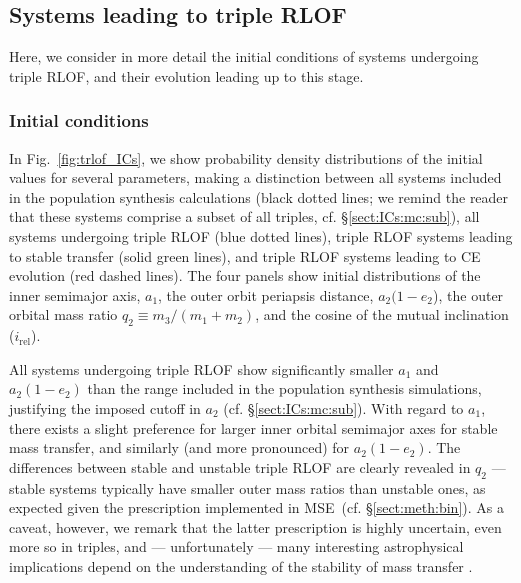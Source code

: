 \documentclass[twocolumn,appendixfloats,tighten]{aastex631}
\newcommand{\F}{Fig.}
\newcommand{\mse}{\textsc{MSE}}
\begin{document}
\subsection{Systems leading to triple RLOF}
\label{sect:popsyn:trlof}
Here, we consider in more detail the initial conditions of systems undergoing triple RLOF, and their evolution leading up to this stage. 

\subsubsection{Initial conditions}
\label{sect:popsyn:trlof:ICs}
In \F~\ref{fig:trlof_ICs}, we show probability density distributions of the initial values for several parameters, making a distinction between all systems included in the population synthesis calculations (black dotted lines; we remind the reader that these systems comprise a subset of all triples, cf. \S\ref{sect:ICs:mc:sub}), all systems undergoing triple RLOF (blue dotted lines), triple RLOF systems leading to stable transfer (solid green lines), and triple RLOF systems leading to CE evolution (red dashed lines). The four panels show initial distributions of the inner semimajor axis, $a_1$, the outer orbit periapsis distance, $a_2(1-e_2$), the outer orbital mass ratio $q_2 \equiv m_3/(m_1+m_2)$, and the cosine of the mutual inclination ($i_\mathrm{rel}$).  

All systems undergoing triple RLOF show significantly smaller $a_1$ and $a_2(1-e_2)$ than the range included in the population synthesis simulations, justifying the imposed cutoff in $a_2$ (cf. \S\ref{sect:ICs:mc:sub}). With regard to $a_1$, there exists a slight preference for larger inner orbital semimajor axes for stable mass transfer, and similarly (and more pronounced) for $a_2(1-e_2)$. The differences between stable and unstable triple RLOF are clearly revealed in $q_2$ --- stable systems typically have smaller outer mass ratios than unstable ones, as expected given the prescription implemented in \mse~(cf. \S\ref{sect:meth:bin}). As a caveat, however, we remark that the latter prescription is highly uncertain, even more so in triples, and --- unfortunately --- many interesting astrophysical implications depend on the understanding of the stability of mass transfer \citep[e.g.,][]{2021arXiv210705702G}. 
\end{document}
